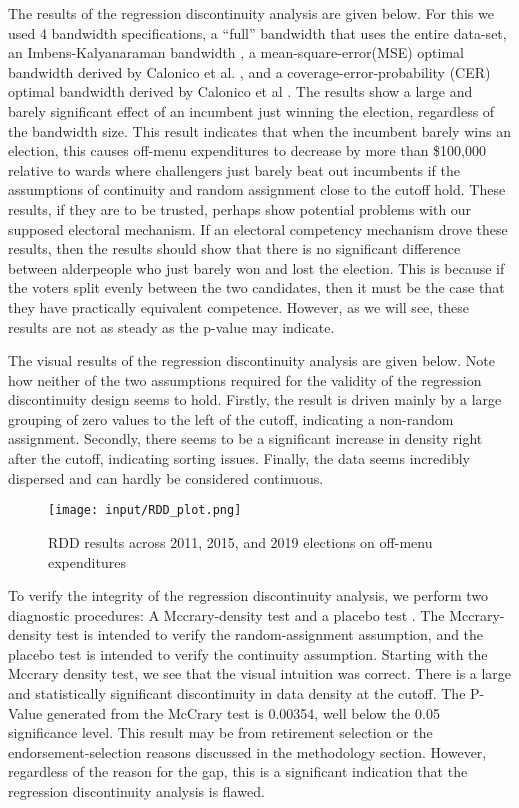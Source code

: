 The results of the regression discontinuity analysis are given below. 
For this we used 4 bandwidth specifications, a ``full'' bandwidth that uses the entire data-set, an Imbens-Kalyanaraman bandwidth \cite{IK_bandwidth}, a mean-square-error(MSE) optimal bandwidth derived by Calonico et al.
 \cite{CCF_MSE}, and a coverage-error-probability (CER) optimal bandwidth derived by Calonico et al \cite{CCF_CER}. 
 The results show a large and barely significant effect of an incumbent just winning the election, regardless of the bandwidth size. 
 This result indicates that when the incumbent barely wins an election, this causes off-menu expenditures to decrease by more than \$100,000 relative to wards where challengers just barely beat out incumbents if the assumptions of continuity and random assignment close to the cutoff hold. 
 These results, if they are to be trusted, perhaps show potential problems with our supposed electoral mechanism. 
 If an electoral competency mechanism drove these results, then the results should show that there is no significant difference between alderpeople who just barely won and lost the election. 
 This is because if the voters split evenly between the two candidates, then it must be the case that they have practically equivalent competence. 
 However, as we will see, these results are not as steady as the p-value may indicate. 

 

The visual results of the regression discontinuity analysis are given below. 
Note how neither of the two assumptions required for the validity of the regression discontinuity design seems to hold. 
Firstly, the result is driven mainly by a large grouping of zero values to the left of the cutoff, indicating a non-random assignment. 
Secondly, there seems to be a significant increase in density right after the cutoff, indicating sorting issues. 
Finally, the data seems incredibly dispersed and can hardly be considered continuous. 

\begin{figure}[H]
    \centering
    \texttt{[image: input/RDD\_plot.png]}
        \caption{RDD results across 2011, 2015, and 2019 elections on off-menu expenditures}
\end{figure}

To verify the integrity of the regression discontinuity analysis, we perform two diagnostic procedures: A Mccrary-density test and a placebo test \cite{MCCRARY2008698}. 
The Mccrary-density test is intended to verify the random-assignment assumption, and the placebo test is intended to verify the continuity assumption. 
Starting with the Mccrary density test, we see that the visual intuition was correct. 
There is a large and statistically significant discontinuity in data density at the cutoff. 
The P-Value generated from the McCrary test is 0.00354, well below the 0.05 significance level. 
This result may be from retirement selection or the endorsement-selection reasons discussed in the methodology section. 
However, regardless of the reason for the gap, this is a significant indication that the regression discontinuity analysis is flawed.

